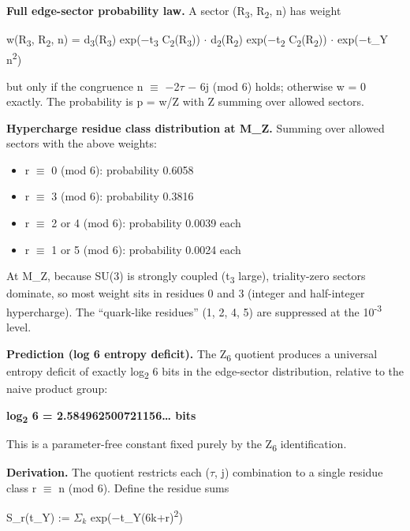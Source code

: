 \documentclass[11pt,a4paper]{article}
\theoremstyle{remark}
\providecommand{\tightlist}{%
  \setlength{\itemsep}{0pt}\setlength{\parskip}{0pt}}
\begin{document}
\textbf{Full edge-sector probability law.} A sector (R\textsubscript{3}, R\textsubscript{2}, n) has weight

w(R\textsubscript{3}, R\textsubscript{2}, n) = d\textsubscript{3}(R\textsubscript{3}) exp(\ensuremath{-}t\textsubscript{3} C\textsubscript{2}(R\textsubscript{3})) \ensuremath{\cdot} d\textsubscript{2}(R\textsubscript{2}) exp(\ensuremath{-}t\textsubscript{2} C\textsubscript{2}(R\textsubscript{2})) \ensuremath{\cdot} exp(\ensuremath{-}t\_Y n\textsuperscript{2})

but only if the congruence n \ensuremath{\equiv} \ensuremath{-}2\ensuremath{\tau} \ensuremath{-} 6j (mod 6) holds; otherwise w = 0 exactly. The probability is p = w/Z with Z summing over allowed sectors.

\textbf{Hypercharge residue class distribution at M\_Z.} Summing over allowed
sectors with the above weights:

\begin{itemize}
\tightlist
\item
  r \ensuremath{\equiv} 0 (mod 6): probability 0.6058
\item
  r \ensuremath{\equiv} 3 (mod 6): probability 0.3816
\item
  r \ensuremath{\equiv} 2 or 4 (mod 6): probability 0.0039 each
\item
  r \ensuremath{\equiv} 1 or 5 (mod 6): probability 0.0024 each
\end{itemize}

At M\_Z, because SU(3) is strongly coupled (t\textsubscript{3} large), triality-zero
sectors dominate, so most weight sits in residues 0 and 3 (integer and
half-integer hypercharge). The ``quark-like residues'' (1, 2, 4, 5) are
suppressed at the 10\textsuperscript{-3} level.

\textbf{Prediction (log 6 entropy deficit).} The Z\textsubscript{6} quotient produces a universal entropy deficit of exactly log\textsubscript{2} 6 bits in the edge-sector distribution, relative to the naive product group:

\textbf{log\textsubscript{2} 6 = 2.584962500721156\ldots{} bits}

This is a parameter-free constant fixed purely by the Z\textsubscript{6} identification.

\textbf{Derivation.} The quotient restricts each (\ensuremath{\tau}, j) combination to a single residue class r \ensuremath{\equiv} n (mod 6). Define the residue sums

S\_r(t\_Y) := $\Sigma_k$ exp(\ensuremath{-}t\_Y(6k+r)\textsuperscript{2})
\end{document}

